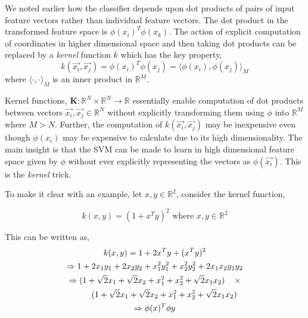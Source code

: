 \documentclass[final,3p,times,twocolumn]{elsarticle}
\begin{document}
We noted earlier how the classifier depends upon dot products of pairs of input feature vectors rather than individual feature vectors. The dot product in the transformed feature space is  $\phi{(x_{i})}^{T}\phi{(x_{k})}$. The action of explicit computation of coordinates in higher dimensional space and then taking dot products can be replaced by a \textit{kernel} function $k$ which has the key property,
\begin{equation}
k(\vec{x_{i}},\vec{x_{j}}) = \phi{(x_{i})}^{T}\phi{(x_{j})} = \langle \phi{(x_{i})},\phi{(x_{j})} \rangle_{M}
\end{equation}
where  $\langle\cdot,\cdot\rangle_{M}$ is an inner product in $\mathbb{R}^M$.

Kernel functions, $\mathbf{K} : \mathbb{R}^N \times \mathbb{R}^N \rightarrow \mathbb{R}$ essentially enable computation of dot products between vectors $\vec{x_{i}}, \vec{x_{j}} \in \mathbb{R}^N$ without explicitly transforming them using $\phi$ into $\mathbb{R}^M$ where $M > N$. Further, the computation of $k(\vec{x_{i}},\vec{x_{j}})$ may be inexpensive even though $\phi{(x_{i})}$ may be expensive to calculate due to its high dimensionality. The main insight is that the SVM can be made to learn in high dimensional feature space given by $\phi$ without ever explicitly representing the vectors as $\phi(\vec{x_{i}})$. This is the \textit{kernel} trick.

To make it clear with an example, let $x, y \in \mathbb{R}^2$, consider the kernel function, 

\begin{equation}
k(x,y) = (1 + {x}^T{y})^2 \textrm{ where } x, y \in \mathbb{R}^2
\end{equation}

This can be written as, 
\begin{gather*}
k(x,y) = 1 + 2x^Ty + (x^Ty)^2 \\
\Rightarrow 1 + 2x_{1}y_{1} + 2x_{2}y_{2} + x_{1}^2y_{1}^2 + x_{2}^2y_{2}^2 + 2x_{1}x_{2}y_{1}y_{2} \\
\Rightarrow (1 + \sqrt{2}x_{1} + \sqrt{2}x_{2} + x_{1}^2 + x_{2}^2 + \sqrt{2}x_{1}x_{2}) \hspace{4mm} \times\\
\hspace{8mm} (1 + \sqrt{2}x_{1} + \sqrt{2}x_{2} + x_{1}^2 + x_{2}^2 + \sqrt{2}x_{1}x_{2}) \\
\Rightarrow \phi(x)^T\phi{y}
\end{gather*}
\end{document}

